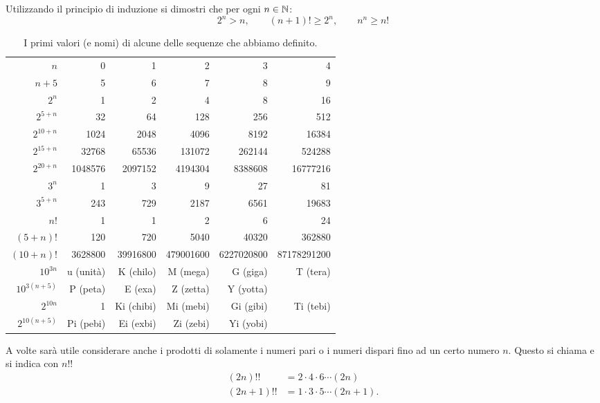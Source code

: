 \begin{exercise}
  Utilizzando il principio di induzione
  si dimostri che per ogni $n\in \mathbb N$:
  \[
    2^n > n, \qquad 
    (n+1)! \ge 2^n, \qquad
    n^n \ge n!
  \]
\end{exercise}

\begin{table}
  \begin{center}
  \begin{tabular}{r|>{\small}r>{\small}r>{\small}r>{\small}r>{\small}r}
  $n$       & 0 & 1 & 2 & 3 & 4 \\
  \footnotesize $n+5$     & 5 & 6 & 7 & 8 & 9 \\ \hline
  $2^n$     & 1 & 2 & 4 & 8 & 16 \\
  \footnotesize $2^{5+n}$ & 32 & 64 & 128 & 256 & 512 \\
  \footnotesize $2^{10+n}$ & 1024 & 2048 & 4096 & 8192 & 16384 \\
  \footnotesize $2^{15+n}$ & 32768 & 65536 & 131072 & 262144 & 524288 \\
  \footnotesize $2^{20+n}$ & 1048576 & 2097152 & 4194304 & 8388608 & 16777216 \\  \hline
  $3^n$                    & 1 & 3 & 9 & 27 & 81 \\
  \footnotesize $3^{5+n}$  & 243 & 729 & 2187 & 6561 & 19683 \\  \hline
  $n!$      & 1 & 1 & 2 & 6 & 24 \\
  \footnotesize $(5+n)!$  & 120 & 720 & 5040 & 40320 & 362880 \\
  \footnotesize $(10+n)!$  & 3628800 & 39916800 & 479001600 & 6227020800 & 87178291200 \\ \hline
  \footnotesize $10^{3n}$  & u (unità) & K (chilo) & M (mega) & G (giga) & T (tera) \\ 
  \footnotesize $10^{3(n+5)}$  & P (peta) & E (exa) & Z (zetta) & Y (yotta) \\ \hline
  \footnotesize $2^{10n}$  & 1 & Ki (chibi) & Mi (mebi) & Gi (gibi) & Ti (tebi) \\
  \footnotesize $2^{10(n+5)}$ & Pi (pebi)& Ei (exbi) & Zi (zebi) & Yi (yobi)
  \end{tabular}
  \end{center}
  \caption{I primi valori (e nomi) di alcune delle sequenze che abbiamo definito.}
  \end{table}
  
  A volte sarà utile considerare anche i prodotti di solamente i numeri
  pari o i numeri dispari fino ad un certo numero $n$. Questo
  si chiama  e si indica con $n!!$
  \begin{align*}
    (2n)!! &= 2 \cdot 4 \cdot 6 \cdots (2n) \\
    (2n+1)!! &= 1 \cdot 3 \cdot 5 \cdots (2n+1).
  \end{align*}
  
